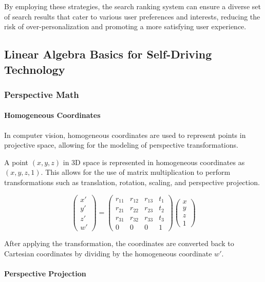 \documentclass[12pt]{article}
\begin{document}
By employing these strategies, the search ranking system can ensure a diverse set of search results that cater to various user preferences and interests, reducing the risk of over-personalization and promoting a more satisfying user experience.

\subsection{Linear Algebra Basics for Self-Driving Technology}

\subsubsection{Perspective Math}

\paragraph{Homogeneous Coordinates}

In computer vision, homogeneous coordinates are used to represent points in projective space, allowing for the modeling of perspective transformations.

A point \((x, y, z)\) in 3D space is represented in homogeneous coordinates as \((x, y, z, 1)\). This allows for the use of matrix multiplication to perform transformations such as translation, rotation, scaling, and perspective projection.

\[
\begin{pmatrix}
x' \\
y' \\
z' \\
w'
\end{pmatrix}
=
\begin{pmatrix}
r_{11} & r_{12} & r_{13} & t_1 \\
r_{21} & r_{22} & r_{23} & t_2 \\
r_{31} & r_{32} & r_{33} & t_3 \\
0 & 0 & 0 & 1
\end{pmatrix}
\begin{pmatrix}
x \\
y \\
z \\
1
\end{pmatrix}
\]

After applying the transformation, the coordinates are converted back to Cartesian coordinates by dividing by the homogeneous coordinate \( w' \).

\paragraph{Perspective Projection}
\end{document}
